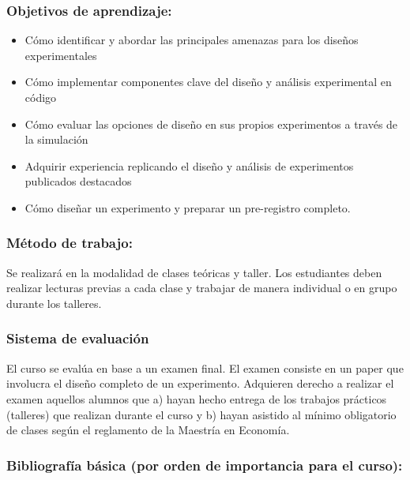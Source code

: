 \documentclass[
  12pt,
]{article}
\providecommand{\tightlist}{%
  \setlength{\itemsep}{0pt}\setlength{\parskip}{0pt}}
\begin{document}
\hypertarget{objetivos-de-aprendizaje-1}{%
\subsubsection{Objetivos de
aprendizaje:}\label{objetivos-de-aprendizaje-1}}

\begin{itemize}
\tightlist
\item
  Cómo identificar y abordar las principales amenazas para los diseños
  experimentales
\item
  Cómo implementar componentes clave del diseño y análisis experimental
  en código
\item
  Cómo evaluar las opciones de diseño en sus propios experimentos a
  través de la simulación
\item
  Adquirir experiencia replicando el diseño y análisis de experimentos
  publicados destacados
\item
  Cómo diseñar un experimento y preparar un pre-registro completo.
\end{itemize}

\hypertarget{muxe9todo-de-trabajo-1}{%
\subsubsection{Método de trabajo:}\label{muxe9todo-de-trabajo-1}}

Se realizará en la modalidad de clases teóricas y taller. Los
estudiantes deben realizar lecturas previas a cada clase y trabajar de
manera individual o en grupo durante los talleres.

\hypertarget{sistema-de-evaluaciuxf3n-1}{%
\subsubsection{Sistema de evaluación}\label{sistema-de-evaluaciuxf3n-1}}

El curso se evalúa en base a un examen final. El examen consiste en un
paper que involucra el diseño completo de un experimento. Adquieren
derecho a realizar el examen aquellos alumnos que a) hayan hecho entrega
de los trabajos prácticos (talleres) que realizan durante el curso y b)
hayan asistido al mínimo obligatorio de clases según el reglamento de la
Maestría en Economía.

\hypertarget{bibliografuxeda-buxe1sica-por-orden-de-importancia-para-el-curso-1}{%
\subsubsection{Bibliografía básica (por orden de importancia para el
curso):}\label{bibliografuxeda-buxe1sica-por-orden-de-importancia-para-el-curso-1}}
\end{document}
